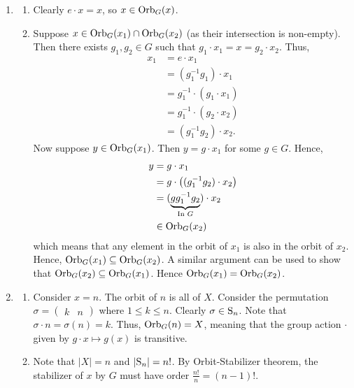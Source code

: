 \begin{enumerate}
	\item \begin{enumerate}[label=(\alph*)]
	    \item Clearly $e \cdot x = x$, so $x \in \mathrm{Orb}_{G}(x)$.
	    \item Suppose $x \in \mathrm{Orb}_{G}(x_1) \cap \mathrm{Orb}_{G}(x_2)$ (as their intersection is non-empty). Then there exists $g_1, g_2 \in G$ such that $g_1\cdot x_1 = x = g_2\cdot x_2$. Thus,
	    \begin{align*}
	        x_1 &= e \cdot x_1\\
	        &= (g_1^{-1}g_1)\cdot x_1\\
	        &= g_1^{-1} \cdot (g_1 \cdot x_1)\\
	        &= g_1^{-1} \cdot (g_2 \cdot x_2)\\
	        &= (g_1^{-1}g_2) \cdot x_2.
	    \end{align*}
	    Now suppose $y \in \mathrm{Orb}_{G}(x_1)$. Then $y = g\cdot x_1$ for some $g \in G$. Hence,
	    \begin{align*}
	        y &= g\cdot x_1 \\
	        &= g \cdot \left((g_1^{-1}g_2) \cdot x_2\right)\\
	        &= (\underbrace{gg_1^{-1}g_2}_{\text{In } G})\cdot x_2\\
	        &\in \mathrm{Orb}_{G}(x_2)
	    \end{align*}
	    which means that any element in the orbit of $x_1$ is also in the orbit of $x_2$. Hence, $\mathrm{Orb}_{G}(x_1) \subseteq \mathrm{Orb}_{G}(x_2)$. A similar argument can be used to show that $\mathrm{Orb}_{G}(x_2) \subseteq \mathrm{Orb}_{G}(x_1)$. Hence $\mathrm{Orb}_{G}(x_1) = \mathrm{Orb}_{G}(x_2)$.
	\end{enumerate}

	\item \begin{enumerate}[label=(\alph*)]
	    \item Consider $x = n$. The orbit of $n$ is all of $X$. Consider the permutation $\sigma = \begin{pmatrix}k & n\end{pmatrix}$ where $1 \leq k \leq n$. Clearly $\sigma \in \mathrm{S}_{n}$. Note that $\sigma \cdot n = \sigma(n) = k$. Thus, $\mathrm{Orb}_{G}(n) = X$, meaning that the group action $\cdot$ given by $g \cdot x \mapsto g(x)$ is transitive.
	    \item Note that $|X| = n$ and $|\mathrm{S}_{n}| = n!$. By Orbit-Stabilizer theorem, the stabilizer of $x$ by $G$ must have order $\frac{n!}{n} = (n-1)!$.
	\end{enumerate}


\end{enumerate}
